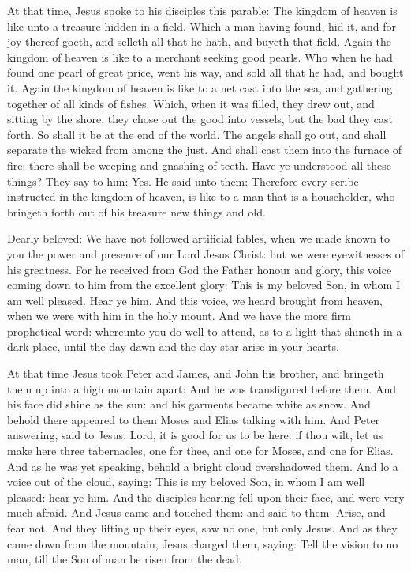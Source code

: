 \medskip


At that time, Jesus spoke to his disciples this parable:
The kingdom of heaven is like unto a treasure hidden in a field.
Which a man having found, hid it, and for joy thereof goeth, and selleth
all that he hath, and buyeth that field.
Again the kingdom of heaven is like to a merchant seeking good
pearls.
Who when he had found one pearl of great price, went his way, and
sold all that he had, and bought it.
Again the kingdom of heaven is like to a net cast into the sea,
and gathering together of all kinds of fishes.
Which, when it was filled, they drew out, and sitting by the
shore, they chose out the good into vessels, but the bad they cast
forth.
So shall it be at the end of the world. The angels shall go out,
and shall separate the wicked from among the just.
And shall cast them into the furnace of fire: there shall be
weeping and gnashing of teeth.
Have ye understood all these things? They say to him: Yes.
He said unto them: Therefore every scribe instructed in the
kingdom of heaven, is like to a man that is a householder, who bringeth
forth out of his treasure new things and old.


\bigskip

\columnbreak




Dearly beloved:
We have not followed artificial fables, when we made known to you
the power and presence of our Lord Jesus Christ: but we were
eyewitnesses of his greatness.
For he received from God the Father honour and glory, this voice
coming down to him from the excellent glory: This is my beloved Son, in
whom I am well pleased. Hear ye him.
And this voice, we heard brought from heaven, when we were with
him in the holy mount.
And we have the more firm prophetical word: whereunto you do well
to attend, as to a light that shineth in a dark place, until the day
dawn and the day star arise in your hearts.



At that time Jesus took Peter and James, and John his brother,
and bringeth them up into a high mountain apart: And he was transfigured before
them. And his face did shine as the sun: and his garments became white as snow.
And behold there appeared to them Moses and Elias talking with him.  And Peter
answering, said to Jesus: Lord, it is good for us to be here: if thou wilt, let
us make here three tabernacles, one for thee, and one for Moses, and one for
Elias.  And as he was yet speaking, behold a bright cloud overshadowed them.
And lo a voice out of the cloud, saying: This is my beloved Son, in whom I am
well pleased: hear ye him.  And the disciples hearing fell upon their face, and
were very much afraid.  And Jesus came and touched them: and said to them:
Arise, and fear not.  And they lifting up their eyes, saw no one, but only
Jesus.  And as they came down from the mountain, Jesus charged them, saying:
Tell the vision to no man, till the Son of man be risen from the dead.

